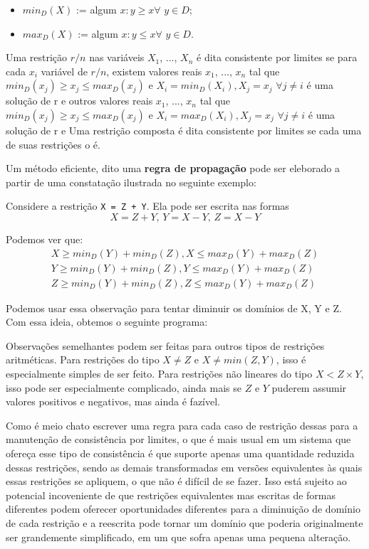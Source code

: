 \documentclass{article}
\begin{document}
\begin{itemize}
  \item $min_D(X)$ := algum $x: y \geq x \forall$ $y \in D$;
  \item $max_D(X)$ := algum $x: y \leq x \forall$ $y \in D$.
\end{itemize}

\begin{definition}
  Uma restrição $r/n$ nas variáveis $X_1$, ..., $X_n$ é dita consistente por limites
  se para cada $x_i$ variável de $r/n$, existem valores reais $x_1$, ..., $x_n$ tal que $min_D(x_j) \geq x_j \leq max_D(x_j)$
  e $X_i = min_D(X_i), X_j = x_j$ $\forall j \neq i$ é uma solução de r e outros valores reais $x_1$, ..., $x_n$ tal que
  $min_D(x_j) \geq x_j \leq max_D(x_j)$  e $X_i = max_D(X_i), X_j = x_j$ $\forall j \neq i$ é uma solução de r e
  Uma restrição composta é dita consistente por limites se cada uma de suas restrições o é.
\end{definition}

Um método eficiente, dito uma \textbf{regra de propagação} pode ser eleborado a partir
de uma constatação ilustrada no seguinte exemplo:

Considere a restrição {\tt X = Z + Y}. Ela pode ser escrita nas formas
\[
  X = Z + Y \text{, } Y = X - Y \text{, } Z = X - Y
\]

Podemos ver que:
\begin{gather}
  X \geq min_D(Y)+min_D(Z),  X \leq max_D(Y) + max_D(Z)\\
  Y \geq min_D(Y)+min_D(Z),  Y \leq max_D(Y) + max_D(Z)\\
  Z \geq min_D(Y)+min_D(Z),  Z \leq max_D(Y) + max_D(Z)
\end{gather}

Podemos usar essa observação para tentar diminuir os domínios de X, Y e Z. Com essa ideia, obtemos o seguinte programa:

\label{lst:bounds}

Observações semelhantes podem ser feitas para outros tipos de restrições aritméticas. Para restrições do tipo $X \neq Z$ e $X  \neq min(Z, Y)$, isso é especialmente simples de ser feito. Para restrições  não lineares do tipo $X < Z\times Y$, isso pode ser
especialmente complicado, ainda mais se $Z$ e $Y$ puderem assumir valores positivos e negativos, mas ainda é fazível.

Como é meio chato escrever uma regra para cada caso de restrição dessas para a manutenção de consistência por limites, o que é
mais usual em um sistema que ofereça esse tipo de consistência é que suporte apenas uma quantidade reduzida dessas restrições,
sendo as demais transformadas em versões equivalentes às quais essas restrições se apliquem, o que não é difícil de se fazer.
Isso está sujeito ao potencial incoveniente de que restrições equivalentes mas escritas de formas diferentes podem oferecer
oportunidades diferentes para a diminuição de domínio de cada restrição e a reescrita pode tornar um domínio que poderia
originalmente ser grandemente simplificado, em um que sofra apenas uma pequena alteração.
\end{document}
